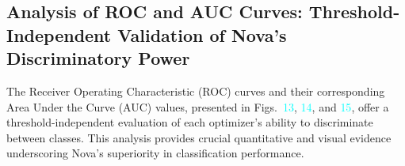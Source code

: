 \documentclass[10pt,twocolumn]{article}
\begin{document}
%
%

\subsection{Analysis of ROC and AUC Curves: Threshold-Independent Validation of Nova’s Discriminatory Power}
The Receiver Operating Characteristic (ROC) curves and their corresponding Area Under the Curve (AUC) values, presented in Figs.~\textcolor{cyan}{13}, \textcolor{cyan}{14}, and \textcolor{cyan}{15}, offer a threshold-independent evaluation of each optimizer’s ability to discriminate between classes. This analysis provides crucial quantitative and visual evidence underscoring Nova’s superiority in classification performance.
\end{document}
